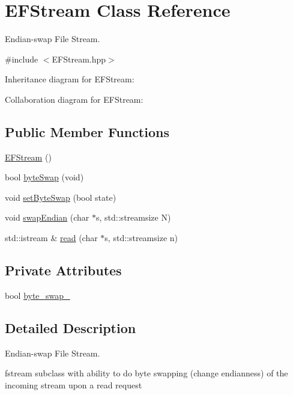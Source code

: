 \hypertarget{classEFStream}{}\section{E\+F\+Stream Class Reference}
\label{classEFStream}


Endian-\/swap File Stream.  




{\ttfamily \#include $<$E\+F\+Stream.\+hpp$>$}



Inheritance diagram for E\+F\+Stream\+:


Collaboration diagram for E\+F\+Stream\+:
\subsection*{Public Member Functions}
\begin{DoxyCompactItemize}
\item 
\hyperlink{classEFStream_a79e9741282d62a6fba8f9e649e307546}{E\+F\+Stream} ()
\item 
bool \hyperlink{classEFStream_a86ccb88060088d1e7bf278e45d2283b0}{byte\+Swap} (void)
\item 
void \hyperlink{classEFStream_a6cf46774a9ee06bd7d88012164e17694}{set\+Byte\+Swap} (bool state)
\item 
void \hyperlink{classEFStream_a075952e4563a027d683d8e3f9f4b4a1e}{swap\+Endian} (char $\ast$s, std\+::streamsize N)
\item 
std\+::istream \& \hyperlink{classEFStream_aaa86c07faca9c33d6d2c549a71ca5041}{read} (char $\ast$s, std\+::streamsize n)
\end{DoxyCompactItemize}
\subsection*{Private Attributes}
\begin{DoxyCompactItemize}
\item 
bool \hyperlink{classEFStream_a9e7b2aa69dc2abc88fcecbb61fd374b0}{byte\+\_\+swap\+\_\+}
\end{DoxyCompactItemize}


\subsection{Detailed Description}
Endian-\/swap File Stream. 

fstream subclass with ability to do byte swapping (change endianness) of the incoming stream upon a read request 

